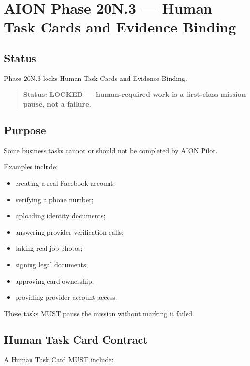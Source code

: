 \section{AION Phase 20N.3 --- Human Task Cards and Evidence Binding}
\label{sec:aion-phase20n3-human-task-cards-evidence-binding}

\subsection{Status}

Phase 20N.3 locks Human Task Cards and Evidence Binding.

\begin{quote}
\textbf{Status: LOCKED --- human-required work is a first-class mission pause, not a failure.}
\end{quote}

\subsection{Purpose}

Some business tasks cannot or should not be completed by AION Pilot.

Examples include:

\begin{itemize}
  \item creating a real Facebook account;
  \item verifying a phone number;
  \item uploading identity documents;
  \item answering provider verification calls;
  \item taking real job photos;
  \item signing legal documents;
  \item approving card ownership;
  \item providing provider account access.
\end{itemize}

These tasks MUST pause the mission without marking it failed.

\subsection{Human Task Card Contract}

A Human Task Card MUST include:

